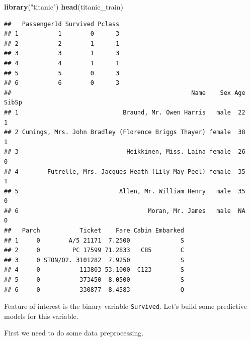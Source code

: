 \documentclass[]{krantz}
\newenvironment{Shaded}{\begin{snugshade}}{\end{snugshade}}
\newcommand{\DecValTok}[1]{\textcolor[rgb]{0.00,0.00,0.81}{#1}}
\newcommand{\KeywordTok}[1]{\textcolor[rgb]{0.13,0.29,0.53}{\textbf{#1}}}
\newcommand{\NormalTok}[1]{#1}
\newcommand{\OperatorTok}[1]{\textcolor[rgb]{0.81,0.36,0.00}{\textbf{#1}}}
\newcommand{\StringTok}[1]{\textcolor[rgb]{0.31,0.60,0.02}{#1}}
\theoremstyle{definition}
\theoremstyle{definition}
\theoremstyle{definition}
\theoremstyle{remark}
\begin{document}
\begin{Shaded}
\begin{Highlighting}[]
\KeywordTok{library}\NormalTok{(}\StringTok{"titanic"}\NormalTok{)}
\KeywordTok{head}\NormalTok{(titanic_train)}
\end{Highlighting}
\end{Shaded}

\begin{verbatim}
##   PassengerId Survived Pclass
## 1           1        0      3
## 2           2        1      1
## 3           3        1      3
## 4           4        1      1
## 5           5        0      3
## 6           6        0      3
##                                                  Name    Sex Age SibSp
## 1                             Braund, Mr. Owen Harris   male  22     1
## 2 Cumings, Mrs. John Bradley (Florence Briggs Thayer) female  38     1
## 3                              Heikkinen, Miss. Laina female  26     0
## 4        Futrelle, Mrs. Jacques Heath (Lily May Peel) female  35     1
## 5                            Allen, Mr. William Henry   male  35     0
## 6                                    Moran, Mr. James   male  NA     0
##   Parch           Ticket    Fare Cabin Embarked
## 1     0        A/5 21171  7.2500              S
## 2     0         PC 17599 71.2833   C85        C
## 3     0 STON/O2. 3101282  7.9250              S
## 4     0           113803 53.1000  C123        S
## 5     0           373450  8.0500              S
## 6     0           330877  8.4583              Q
\end{verbatim}

Feature of interest is the binary variable \texttt{Survived}. Let's
build some predictive models for this variable.

First we need to do some data preprocessing.

\begin{Shaded}
\end{Shaded}
\end{document}
